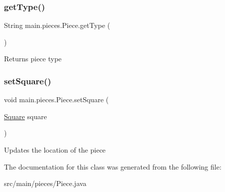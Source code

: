 \subsubsection{\texorpdfstring{get\+Type()}{getType()}}
{\footnotesize\ttfamily String main.\+pieces.\+Piece.\+get\+Type (\begin{DoxyParamCaption}{ }\end{DoxyParamCaption})\hspace{0.3cm}{\ttfamily [inline]}}

Returns piece type \mbox{\label{classmain_1_1pieces_1_1_piece_a8f19216cafccc3889f9143ad13a4c7be}} 
\subsubsection{\texorpdfstring{set\+Square()}{setSquare()}}
{\footnotesize\ttfamily void main.\+pieces.\+Piece.\+set\+Square (\begin{DoxyParamCaption}\item[{\hyperlink{classmain_1_1_square}{Square}}]{square }\end{DoxyParamCaption})\hspace{0.3cm}{\ttfamily [inline]}}

Updates the location of the piece 

The documentation for this class was generated from the following file\+:\begin{DoxyCompactItemize}
\item 
src/main/pieces/Piece.\+java\end{DoxyCompactItemize}
